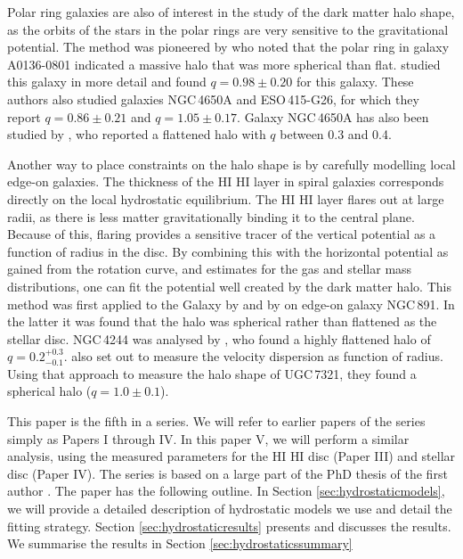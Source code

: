 \documentclass[useAMS,usenatbib]{mn2e}
\newcommand{\hi}{%
  \relax
  \ifmmode
    \textrm{\textsc{HI}}
  \else
    \textsc{H{\smaller}I}
  \fi
}
\begin{document}
Polar ring galaxies are also of interest in the study of the dark 
matter halo shape, as the orbits of the stars in the polar rings 
are very sensitive to the gravitational potential.
The method was pioneered by \citet{Schweizer1983A} who noted that 
the polar ring in galaxy A0136-0801 indicated a massive halo that 
was more spherical than flat.
\citet{Whitmore1987A} studied this galaxy in more detail and found 
$q=0.98\pm0.20$ for this galaxy.
These authors also studied galaxies NGC\,4650A and ESO\,415-G26, 
for which they report $q=0.86\pm0.21$ and $q=1.05\pm0.17$.
Galaxy NGC\,4650A has also been studied by \citet{Sackett1994A}, 
who reported a flattened halo with $q$ between 0.3 and 0.4.



Another way to place constraints on the halo shape is by carefully 
modelling local edge-on galaxies.
The thickness of the \hi layer in spiral galaxies corresponds directly 
on the local hydrostatic equilibrium.
The \hi layer flares out  at large radii, as there is less matter 
gravitationally binding it to the central plane.
Because of this, flaring provides a sensitive tracer of the vertical
 potential as a function of radius in the disc.
By combining this with the horizontal potential as gained from the 
rotation curve, and estimates for the gas and stellar mass 
distributions, one can fit the potential well created by the dark matter halo.
This method was first applied to the Galaxy by \citet{Celnik1979A} and
by \citet{vdk81c} on edge-on galaxy NGC\,891. In the latter it
was found that the halo was spherical rather than flattened as the stellar disc.
NGC\,4244 was analysed by \citet{Olling1995A}, who found a 
highly flattened halo of $q=0.2^{+0.3}_{-0.1}$.
\citet{OBrien2010D} also set out to  measure the velocity 
dispersion as function of radius.
Using that approach to measure the halo shape of {UGC\,7321}, 
they found a spherical halo ($q = 1.0 \pm 0.1$).

This paper is the fifth in a series. We will refer to earlier papers
of the series simply as Papers I through IV.
In this paper V, we will perform a similar analysis, using the 
measured parameters for the \hi disc (Paper III) 
and stellar disc (Paper IV). The series is based on 
a large part of the PhD thesis
of the first author \citep{Peters2014}.
The paper has the following outline. 
In Section \ref{sec:hydrostaticmodels}, we will provide a detailed 
description of hydrostatic models we use and detail the fitting strategy.
Section \ref{sec:hydrostaticresults} presents and discusses the results.
We summarise the results in Section \ref{sec:hydrostaticssummary}
\end{document}
